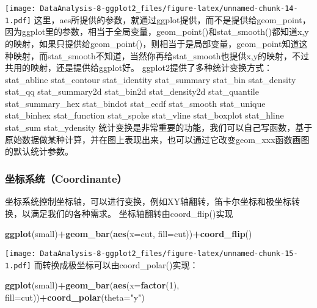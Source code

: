 \documentclass[]{article}
\newenvironment{Shaded}{\begin{snugshade}}{\end{snugshade}}
\newcommand{\KeywordTok}[1]{\textcolor[rgb]{0.13,0.29,0.53}{\textbf{#1}}}
\newcommand{\DataTypeTok}[1]{\textcolor[rgb]{0.13,0.29,0.53}{#1}}
\newcommand{\DecValTok}[1]{\textcolor[rgb]{0.00,0.00,0.81}{#1}}
\newcommand{\StringTok}[1]{\textcolor[rgb]{0.31,0.60,0.02}{#1}}
\newcommand{\OperatorTok}[1]{\textcolor[rgb]{0.81,0.36,0.00}{\textbf{#1}}}
\newcommand{\NormalTok}[1]{#1}
\begin{document}
\texttt{[image: DataAnalysis-8-ggplot2\_files/figure-latex/unnamed-chunk-14-1.pdf]}
这里，aes所提供的参数，就通过ggplot提供，而不是提供给geom\_point，因为ggplot里的参数，相当于全局变量，geom\_point()和stat\_smooth()都知道x,y的映射，如果只提供给geom\_point()，则相当于是局部变量，geom\_point知道这种映射，而stat\_smooth不知道，当然你再给stat\_smooth也提供x,y的映射，不过共用的映射，还是提供给ggplot好。
ggplot2提供了多种统计变换方式： stat\_abline stat\_contour
stat\_identity stat\_summary stat\_bin stat\_density stat\_qq
stat\_summary2d stat\_bin2d stat\_density2d stat\_quantile
stat\_summary\_hex stat\_bindot stat\_ecdf stat\_smooth stat\_unique
stat\_binhex stat\_function stat\_spoke stat\_vline stat\_boxplot
stat\_hline stat\_sum stat\_ydensity
统计变换是非常重要的功能，我们可以自己写函数，基于原始数据做某种计算，并在图上表现出来，也可以通过它改变geom\_xxx函数画图的默认统计参数。

\subsubsection{坐标系统（Coordinante）}\label{coordinante}

坐标系统控制坐标轴，可以进行变换，例如XY轴翻转，笛卡尔坐标和极坐标转换，以满足我们的各种需求。
坐标轴翻转由coord\_flip()实现

\begin{Shaded}
\begin{Highlighting}[]
\KeywordTok{ggplot}\NormalTok{(small)}\OperatorTok{+}\KeywordTok{geom_bar}\NormalTok{(}\KeywordTok{aes}\NormalTok{(}\DataTypeTok{x=}\NormalTok{cut, }\DataTypeTok{fill=}\NormalTok{cut))}\OperatorTok{+}\KeywordTok{coord_flip}\NormalTok{()}
\end{Highlighting}
\end{Shaded}

\texttt{[image: DataAnalysis-8-ggplot2\_files/figure-latex/unnamed-chunk-15-1.pdf]}
而转换成极坐标可以由coord\_polar()实现：

\begin{Shaded}
\begin{Highlighting}[]
\KeywordTok{ggplot}\NormalTok{(small)}\OperatorTok{+}\KeywordTok{geom_bar}\NormalTok{(}\KeywordTok{aes}\NormalTok{(}\DataTypeTok{x=}\KeywordTok{factor}\NormalTok{(}\DecValTok{1}\NormalTok{), }\DataTypeTok{fill=}\NormalTok{cut))}\OperatorTok{+}\KeywordTok{coord_polar}\NormalTok{(}\DataTypeTok{theta=}\StringTok{"y"}\NormalTok{)}
\end{Highlighting}
\end{Shaded}
\end{document}
